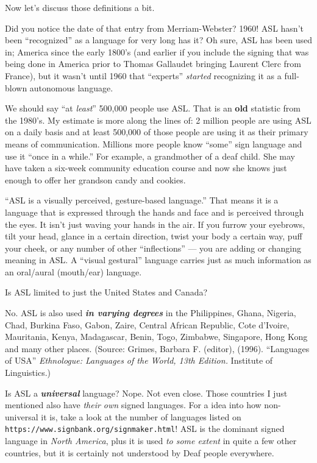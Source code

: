 \documentclass{article}
\begin{document}
Now let's discuss those definitions a bit.

Did you notice the date of that entry from Merriam-Webster?
1960!
ASL hasn't been ``recognized'' as a language for very long has it?
Oh sure, ASL has been used in; America since the early 1800's (and earlier if you include the signing that was being done in America prior to Thomas Gallaudet bringing Laurent Clerc from France), but it wasn't until 1960 that ``experts'' \emph{started} recognizing it as a full-blown autonomous language.

We should say ``at \emph{least}'' 500,000 people use ASL.
That is an \textbf{old} statistic from the 1980's.
My estimate is more along the lines of:
2 million people are using ASL on a daily basis and at least 500,000 of those people are using it as their primary means of communication.
Millions more people know ``some'' sign language and use it ``once in a while.''
For example, a grandmother of a deaf child.
She may have taken a six-week community education course and now she knows just enough to offer her grandson candy and cookies.

``ASL is a visually perceived, gesture-based language.''
That means it is a language that is expressed through the hands and face and is perceived through the eyes.
It isn't just  waving your hands in the air.
If you furrow your eyebrows, tilt your head, glance in a certain direction, twist your body a certain way, puff your cheek, or any number of other ``inflections'' --- you are adding or changing meaning in ASL.
A ``visual gestural'' language carries just as much information as an oral/aural (mouth/ear) language.

Is ASL limited to just the United States and Canada?

No.
ASL is also used \textbf{\emph{in varying degrees}} in the Philippines, Ghana, Nigeria, Chad, Burkina Faso, Gabon, Zaire, Central African Republic, Cote d'Ivoire, Mauritania, Kenya, Madagascar, Benin, Togo, Zimbabwe, Singapore, Hong Kong and many other places.
{\small (Source: Grimes, Barbara F. (editor), (1996). ``Languages of USA'' \emph{Ethnologue: Languages of the World, 13th Edition.} Institute of Linguistics.)}

Is ASL a \textbf{\emph{universal}} language?
Nope.
Not even close.
Those countries I just mentioned also have \emph{their own} signed languages.
For a idea into how non-universal it is, take a look at the number of languages listed on \texttt{https://www.signbank.org/signmaker.html}!
ASL is the dominant signed language in \emph{North America}, plus it is used \emph{to some extent} in quite a few other countries, but it is certainly not understood by Deaf people everywhere.
\end{document}
